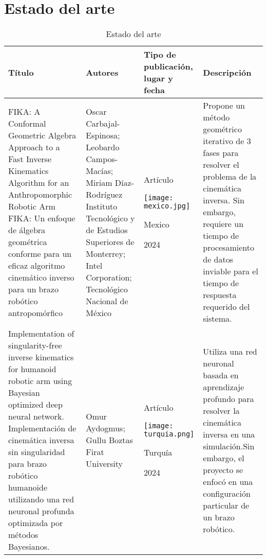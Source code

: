 \section{Estado del arte}

\begin{table}[h]
	\caption{Estado del arte}
	\begin{tabular}{p{5cm}p{4cm}p{3.6cm}p{4cm}}
		\textbf{Título} & \textbf{Autores} & \textbf{Tipo de publicación, lugar y fecha} & \textbf{Descripción} \\ 
		\midrule
		FIKA: A Conformal Geometric Algebra Approach to a Fast Inverse Kinematics Algorithm for an Anthropomorphic Robotic Arm \newline\newline
		FIKA: Un enfoque de álgebra geométrica conforme para un eficaz algoritmo cinemático inverso para un brazo robótico antropomórfico &  
		Oscar Carbajal-Espinosa; Leobardo Campos-Macías; Miriam Díaz-Rodríguez \newline\newline
		Instituto Tecnológico y de Estudios Superiores de Monterrey; Intel Corporation; Tecnológico Nacional de México & 
		\begin{center}Artículo \par \texttt{[image: mexico.jpg]} \par Mexico \par 2024\end{center} & 
		Propone un método geométrico iterativo de 3 fases para resolver el problema de la cinemática inversa.\newline\newline
		Sin embargo, requiere un tiempo de procesamiento de datos inviable para el tiempo de respuesta requerido del sistema.\\
		\midrule
		Implementation of singularity-free inverse kinematics for humanoid robotic arm using Bayesian optimized deep neural network. \newline\newline
		Implementación de cinemática inversa sin singularidad para brazo robótico humanoide utilizando una red neuronal profunda optimizada por métodos Bayesianos. &  
		Omur Aydogmus; Gullu Boztas \newline\newline 
		Firat University & 
		\begin{center}Artículo \par \texttt{[image: turquia.png]} \par Turquía \par 2024\end{center} & 
		Utiliza una red neuronal basada en aprendizaje profundo para resolver la cinemática inversa en una simulación.\newline\newline Sin embargo, el proyecto se enfocó en una configuración particular de un brazo robótico. \\
	\end{tabular}
\end{table}

